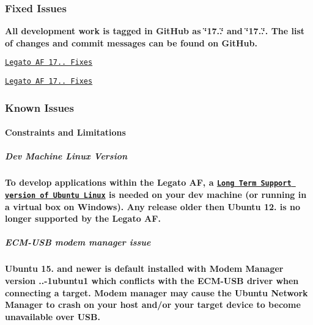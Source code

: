 {\bfseries }\hypertarget{releaseNotes17081_rn1708_Fixes}{}\subsubsection{Fixed Issues}\label{releaseNotes17081_rn1708_Fixes}
{\bfseries  All development work is tagged in Git\+Hub as \char`\"{}17..\char`\"{} and \char`\"{}17..\char`\"{}. The list of changes and commit messages can be found on Git\+Hub.}

{\bfseries 
\begin{DoxyItemize}
\item \href{https://github.com/legatoproject/legato-af/commits/17.08.0}{\tt Legato AF 17.. Fixes}
\item \href{https://github.com/legatoproject/legato-af/commits/17.08.1}{\tt Legato AF 17.. Fixes}
\end{DoxyItemize}}

{\bfseries }\hypertarget{releaseNotes17081_rn1708_KnownIssues}{}\subsubsection{Known Issues}\label{releaseNotes17081_rn1708_KnownIssues}
{\bfseries  }\hypertarget{releaseNotes17081_rn1708_Constraints}{}\paragraph{Constraints and Limitations}\label{releaseNotes17081_rn1708_Constraints}
{\bfseries  }\hypertarget{releaseNotes17081_rn1708_ContraintsLinuxSupport}{}\subparagraph{Dev Machine Linux Version}\label{releaseNotes17081_rn1708_ContraintsLinuxSupport}
{\bfseries  To develop applications within the Legato AF, a \href{https://www.ubuntu.com/info/release-end-of-life}{\tt Long Term Support version of Ubuntu Linux} is needed on your dev machine (or running in a virtual box on Windows). Any release older then Ubuntu 12. is no longer supported by the Legato AF.}

{\bfseries }\hypertarget{releaseNotes17081_rn1708_ConstECMUSB}{}\subparagraph{E\+C\+M-\/\+U\+S\+B modem manager issue}\label{releaseNotes17081_rn1708_ConstECMUSB}
{\bfseries  Ubuntu 15. and newer is default installed with Modem Manager version {..-\/1ubuntu1} which conflicts with the E\+C\+M-\/\+U\+SB driver when connecting a target. Modem manager may cause the Ubuntu Network Manager to crash on your host and/or your target device to become unavailable over U\+SB.}

